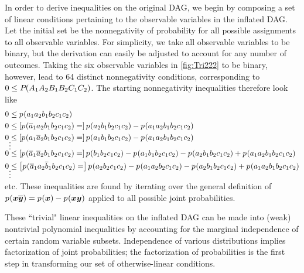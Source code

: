 \label{step:generateineqs}\par\smallskip\nobreak


In order to derive inequalities on the original DAG, we begin by composing a set of linear conditions pertaining to the observable variables in the inflated DAG. Let the initial set be the nonnegativity of probability for all possible assignments to all observable variables. For simplicity, we take all observable variables to be binary, but the derivation can easily be adjusted to account for any number of outcomes. Taking the six observable variables in \cref{fig:Tri222} to be binary, however, lead to 64 distinct nonnegativity conditions, corresponding to $0\leq {P_{}}\lparen A_1 A_2 B_1 B_2 C_1 C_2\rparen$. The starting nonnegativity inequalities therefore look like
\begin{align}
\begin{split}
 0&\leq \p{a_1 a_2 b_1 b_2 c_1 c_2} \\
 0&\leq \left[\p{\n{a}_1 a_2 b_1 b_2 c_1 c_2}=\right]{\p{a_2 b_1 b_2 c_1 c_2} -\p{a_1 a_2 b_1 b_2 c_1 c_2}} \\
  0&\leq \left[\p{a_1 \n{a}_2 b_1 b_2 c_1 c_2}=\right]{\p{a_1 b_1 b_2 c_1 c_2} -\p{a_1 a_2 b_1 b_2 c_1 c_2}} \\
 \MTFlushSpaceAbove&{\vdots}\MTFlushSpaceBelow
 0&\leq \left[\p{\n{a}_1 \n{a}_2 b_1 b_2 c_1 c_2}=\right]{\p{b_1 b_2 c_1 c_2} -\p{a_1 b_1 b_2 c_1 c_2} -\p{a_2 b_1 b_2 c_1 c_2} + \p{a_1 a_2 b_1 b_2 c_1 c_2}}\\
  0&\leq \left[\p{\n{a}_1 a_2 \n{b}_1 b_2 c_1 c_2}=\right]{\p{a_2 b_2 c_1 c_2} -\p{a_1 a_2 b_2 c_1 c_2} -\p{a_2 b_1 b_2 c_1 c_2} + \p{a_1 a_2 b_1 b_2 c_1 c_2}}\\
 \MTFlushSpaceAbove
&{\vdots}
\MTFlushSpaceBelow
\end{split}
\end{align}
etc. These inequalities are found by iterating over the general definition of 
${p_{}}\lparen\bm{x} \overline{\bm{y}}\rparen={p_{}}\lparen\bm{x}\rparen-{p_{}}\lparen\bm{x} \bm{y}\rparen$
applied to all possible joint probabilities.

\label{step:fac}\par\smallskip\nobreak
These ``trivial" linear inequalities on the inflated DAG can be made into (weak) nontrivial polynomial inequalities by accounting for the marginal independence of certain random variable subsets. Independence of various distributions implies factorization of joint probabilities; the factorization of probabilities is the first step in transforming our set of otherwise-linear conditions.

